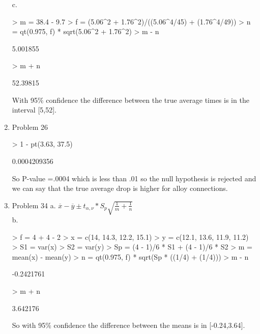 \documentclass[11pt,letterpaper]{article}
\begin{document}
\begin{enumerate}
c.
\begin{Schunk}
\begin{Sinput}
> m = 38.4 - 9.7
> f = (5.06^2 + 1.76^2)/((5.06^4/45) + (1.76^4/49))
> n = qt(0.975, f) * sqrt(5.06^2 + 1.76^2)
> m - n
\end{Sinput}
\begin{Soutput}
[1] 5.001855
\end{Soutput}
\begin{Sinput}
> m + n
\end{Sinput}
\begin{Soutput}
[1] 52.39815
\end{Soutput}
\end{Schunk}
With 95\% confidence the difference between the true average times is in the interval [5,52].

\item Problem 26
\begin{Schunk}
\begin{Sinput}
> 1 - pt(3.63, 37.5)
\end{Sinput}
\begin{Soutput}
[1] 0.0004209356
\end{Soutput}
\end{Schunk}
So P-value =.0004 which is less than .01 so the null hypothesis is rejected and we can say that the true average drop is higher for alloy connections.\\

\item Problem 34
a. $\overline{x}-\overline{y}\pm t_{\alpha,\nu}*S_p\sqrt{\frac{1}{m}+\frac{1}{n}}$\\
b. 
\begin{Schunk}
\begin{Sinput}
> f = 4 + 4 - 2
> x = c(14, 14.3, 12.2, 15.1)
> y = c(12.1, 13.6, 11.9, 11.2)
> S1 = var(x)
> S2 = var(y)
> Sp = (4 - 1)/6 * S1 + (4 - 1)/6 * S2
> m = mean(x) - mean(y)
> n = qt(0.975, f) * sqrt(Sp * ((1/4) + (1/4)))
> m - n
\end{Sinput}
\begin{Soutput}
[1] -0.2421761
\end{Soutput}
\begin{Sinput}
> m + n
\end{Sinput}
\begin{Soutput}
[1] 3.642176
\end{Soutput}
\end{Schunk}
So with 95\% confidence the difference between the means is in [-0.24,3.64].\\


\end{enumerate}
\end{document}
